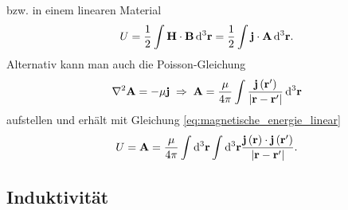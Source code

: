 bzw. in einem linearen Material
\begin{equation}
	\label{eq:magnetische_energie_linear}
	U=\frac{1}{2}\int \mathbf{H}\cdot \mathbf{B}\mathop{}\!\mathrm{d} ^{3}\mathbf{r}=\frac{1}{2}\int \mathbf{j}\cdot \mathbf{A}\mathop{}\!\mathrm{d} ^{3}\mathbf{r}.
\end{equation}
Alternativ kann man auch die Poisson-Gleichung
\begin{equation*}
	\nabla ^{2}\mathbf{A}=-\mu \mathbf{j}\;\Rightarrow\; \mathbf{A}=\frac{\mu }{4\pi }\int \frac{\mathbf{j}\left(\mathbf{r}'\right)}{\left| \mathbf{r}-\mathbf{r}'\right| }\mathop{}\!\mathrm{d} ^{3}\mathbf{r}
\end{equation*}
aufstellen und erhält mit Gleichung \eqref{eq:magnetische_energie_linear}
\begin{equation*}
	U=\mathbf{A}=\frac{\mu }{4\pi }\int \mathop{}\!\mathrm{d} ^{3}\mathbf{r}\int \mathop{}\!\mathrm{d} ^{3}\mathbf{r}\frac{\mathbf{j}\left(\mathbf{r}\right)\cdot \mathbf{j}\left(\mathbf{r}'\right)}{\left| \mathbf{r}-\mathbf{r}'\right| }.
\end{equation*}

\subsection{Induktivität}

